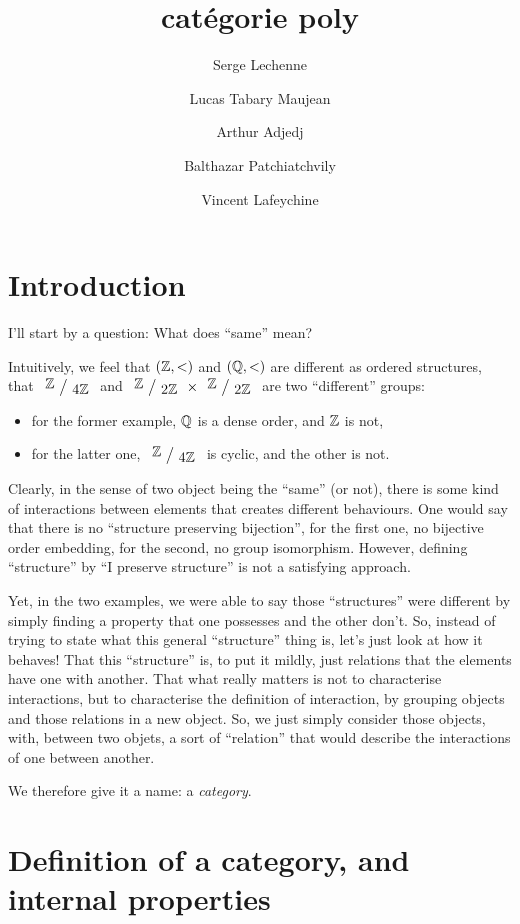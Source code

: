 \documentclass[a4paper]{article}
\title{catégorie poly}
\author{Serge Lechenne \and Lucas Tabary Maujean \and Arthur Adjedj \and Balthazar Patchiatchvily \and Vincent Lafeychine}
\theoremstyle { remark }
\theoremstyle { definition }
\theoremstyle { plain }
\begin{document}
\maketitle

\section{Introduction}

I'll start by a question: What does \enquote{same} mean?

Intuitively, we feel that \( ( \mathbb { Z } , <) \) and \( ( \mathbb { Q } , <) \) are different as ordered structures, that \( \quotient{\Z}{4\Z} \) and \( \quotient{\Z}{2\Z} \times \quotient{\Z}{2\Z} \) are two \enquote{different} groups:
\begin{itemize}
  \item for the former example, \(  \mathbb { Q }  \) is a dense order, and \(  \mathbb { Z }  \) is not,
  \item for the latter one, \( \quotient{\Z}{4\Z} \) is cyclic, and the other is not.
\end{itemize}

Clearly, in the sense of two object being the \enquote{same} (or not), there is some kind of interactions between elements that creates different behaviours.
One would say that there is no \enquote{structure preserving bijection}, for the first one, no bijective order embedding, for the second, no group isomorphism.
However, defining \enquote{structure} by \enquote{I preserve structure} is not a satisfying approach.

Yet, in the two examples, we were able to say those \enquote{structures} were different by simply finding a property that one possesses and the other don't.
So, instead of trying to state what this general \enquote{structure} thing is, let's just look at how it behaves!
That this \enquote{structure} is, to put it mildly, just relations that the elements have one with another.
That what really matters is not to characterise interactions, but to characterise the definition of interaction, by grouping objects and those relations in a new object.
So, we just simply consider those objects, with, between two objets, a sort of \enquote{relation} that would describe the interactions of one between another.

We therefore give it a name: a \emph{category}.

\section{Definition of a category, and internal properties}
\end{document}
